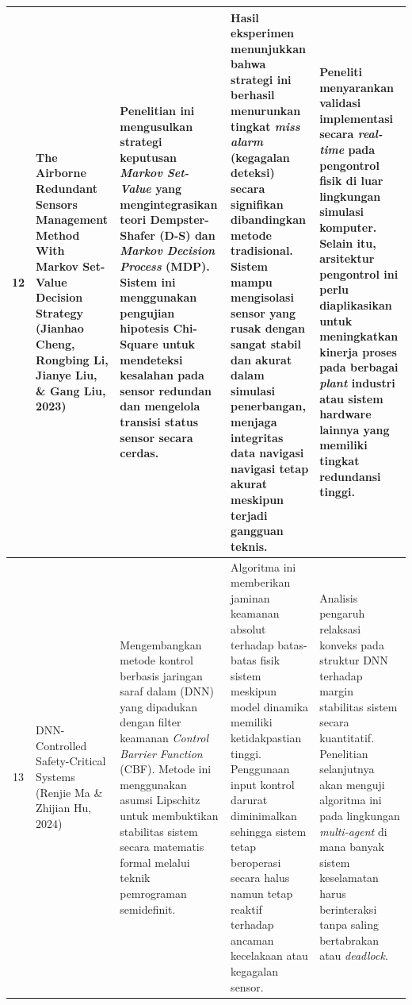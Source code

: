 \documentclass[12pt,a4paper]{article}
\begin{document}
\begin{small}
\begin{longtable}{|c|>{\raggedright\arraybackslash}p{3cm}|>{\raggedright\arraybackslash}p{4cm}|>{\raggedright\arraybackslash}p{4cm}|>{\raggedright\arraybackslash}p{4cm}|}
12 & The Airborne Redundant Sensors Management Method With Markov Set-Value Decision Strategy (Jianhao Cheng, Rongbing Li, Jianye Liu, \& Gang Liu, 2023) & Penelitian ini mengusulkan strategi keputusan \textit{Markov Set-Value} yang mengintegrasikan teori Dempster-Shafer (D-S) dan \textit{Markov Decision Process} (MDP). Sistem ini menggunakan pengujian hipotesis Chi-Square untuk mendeteksi kesalahan pada sensor redundan dan mengelola transisi status sensor secara cerdas. & Hasil eksperimen menunjukkan bahwa strategi ini berhasil menurunkan tingkat \textit{miss alarm} (kegagalan deteksi) secara signifikan dibandingkan metode tradisional. Sistem mampu mengisolasi sensor yang rusak dengan sangat stabil dan akurat dalam simulasi penerbangan, menjaga integritas data navigasi navigasi tetap akurat meskipun terjadi gangguan teknis. & Peneliti menyarankan validasi implementasi secara \textit{real-time} pada pengontrol fisik di luar lingkungan simulasi komputer. Selain itu, arsitektur pengontrol ini perlu diaplikasikan untuk meningkatkan kinerja proses pada berbagai \textit{plant} industri atau sistem hardware lainnya yang memiliki tingkat redundansi tinggi. \\ \hline

13 & DNN-Controlled Safety-Critical Systems (Renjie Ma \& Zhijian Hu, 2024) & Mengembangkan metode kontrol berbasis jaringan saraf dalam (DNN) yang dipadukan dengan filter keamanan \textit{Control Barrier Function} (CBF). Metode ini menggunakan asumsi Lipschitz untuk membuktikan stabilitas sistem secara matematis formal melalui teknik pemrograman semidefinit. & Algoritma ini memberikan jaminan keamanan absolut terhadap batas-batas fisik sistem meskipun model dinamika memiliki ketidakpastian tinggi. Penggunaan input kontrol darurat diminimalkan sehingga sistem tetap beroperasi secara halus namun tetap reaktif terhadap ancaman kecelakaan atau kegagalan sensor. & Analisis pengaruh relaksasi konveks pada struktur DNN terhadap margin stabilitas sistem secara kuantitatif. Penelitian selanjutnya akan menguji algoritma ini pada lingkungan \textit{multi-agent} di mana banyak sistem keselamatan harus berinteraksi tanpa saling bertabrakan atau \textit{deadlock}. \\ \hline


\end{longtable}
\end{small}
\end{document}
